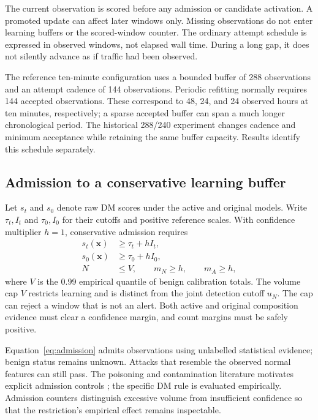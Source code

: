 The current observation is scored before any admission or candidate
activation. A promoted update can affect later windows only. Missing
observations do not enter learning buffers or the scored-window counter.
The ordinary attempt schedule is expressed in observed windows, not
elapsed wall time. During a long gap, it does not silently advance as if
traffic had been observed.

The reference ten-minute configuration uses a bounded buffer of 288
observations and an attempt cadence of 144 observations. Periodic
refitting normally requires 144 accepted observations. These correspond
to 48, 24, and 24 observed hours at ten minutes, respectively; a sparse
accepted buffer can span a much longer chronological period. The historical
288/240 experiment changes cadence and minimum acceptance while retaining
the same buffer capacity. Results identify this schedule separately.

\subsection{Admission to a conservative learning buffer}

Let $s_t$ and $s_0$ denote raw DM scores under the active and original
models. Write $\tau_t,I_t$ and $\tau_0,I_0$ for their cutoffs and positive
reference scales. With confidence multiplier $h=1$, conservative admission
requires
\begin{equation}
 \begin{split}
  s_t(\boldsymbol{x})&\geq\tau_t+hI_t,\\
  s_0(\boldsymbol{x})&\geq\tau_0+hI_0,\\
  N&\leq V,\qquad m_N\geq h,\qquad m_A\geq h,
 \end{split}
\label{eq:admission}
\end{equation}
where $V$ is the 0.99 empirical quantile of benign calibration totals.
The volume cap $V$ restricts learning and is distinct from the joint
detection cutoff $u_N$. The cap can reject a window that is not an alert.
Both active and original composition evidence must clear a confidence
margin, and count margins must be safely positive.

Equation~\eqref{eq:admission} admits observations using unlabelled
statistical evidence; benign status remains unknown. Attacks that resemble
the observed normal features can still pass. The poisoning and contamination
literature motivates explicit admission controls
\cite{kloft2012,cretu2008}; the specific DM rule is evaluated empirically.
Admission counters distinguish excessive volume from insufficient
confidence so that the restriction's empirical effect remains inspectable.

